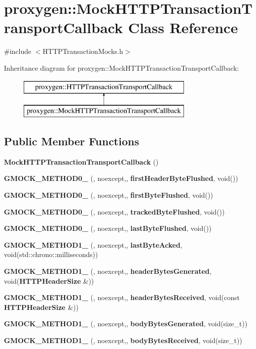 \section{proxygen\+:\+:Mock\+H\+T\+T\+P\+Transaction\+Transport\+Callback Class Reference}
\label{classproxygen_1_1MockHTTPTransactionTransportCallback}


{\ttfamily \#include $<$H\+T\+T\+P\+Transaction\+Mocks.\+h$>$}

Inheritance diagram for proxygen\+:\+:Mock\+H\+T\+T\+P\+Transaction\+Transport\+Callback\+:\begin{figure}[H]
\begin{center}
\leavevmode
\includegraphics[height=2.000000cm]{classproxygen_1_1MockHTTPTransactionTransportCallback}
\end{center}
\end{figure}
\subsection*{Public Member Functions}
\begin{DoxyCompactItemize}
\item 
{\bf Mock\+H\+T\+T\+P\+Transaction\+Transport\+Callback} ()
\item 
{\bf G\+M\+O\+C\+K\+\_\+\+M\+E\+T\+H\+O\+D0\+\_\+} (, noexcept,, {\bf first\+Header\+Byte\+Flushed}, void())
\item 
{\bf G\+M\+O\+C\+K\+\_\+\+M\+E\+T\+H\+O\+D0\+\_\+} (, noexcept,, {\bf first\+Byte\+Flushed}, void())
\item 
{\bf G\+M\+O\+C\+K\+\_\+\+M\+E\+T\+H\+O\+D0\+\_\+} (, noexcept,, {\bf tracked\+Byte\+Flushed}, void())
\item 
{\bf G\+M\+O\+C\+K\+\_\+\+M\+E\+T\+H\+O\+D0\+\_\+} (, noexcept,, {\bf last\+Byte\+Flushed}, void())
\item 
{\bf G\+M\+O\+C\+K\+\_\+\+M\+E\+T\+H\+O\+D1\+\_\+} (, noexcept,, {\bf last\+Byte\+Acked}, void(std\+::chrono\+::milliseconds))
\item 
{\bf G\+M\+O\+C\+K\+\_\+\+M\+E\+T\+H\+O\+D1\+\_\+} (, noexcept,, {\bf header\+Bytes\+Generated}, void({\bf H\+T\+T\+P\+Header\+Size} \&))
\item 
{\bf G\+M\+O\+C\+K\+\_\+\+M\+E\+T\+H\+O\+D1\+\_\+} (, noexcept,, {\bf header\+Bytes\+Received}, void(const {\bf H\+T\+T\+P\+Header\+Size} \&))
\item 
{\bf G\+M\+O\+C\+K\+\_\+\+M\+E\+T\+H\+O\+D1\+\_\+} (, noexcept,, {\bf body\+Bytes\+Generated}, void(size\+\_\+t))
\item 
{\bf G\+M\+O\+C\+K\+\_\+\+M\+E\+T\+H\+O\+D1\+\_\+} (, noexcept,, {\bf body\+Bytes\+Received}, void(size\+\_\+t))
\end{DoxyCompactItemize}


